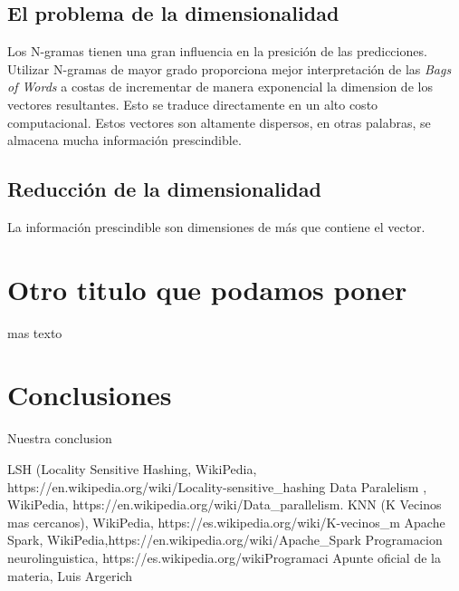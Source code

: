 \documentclass[a4paper,10pt]{article}
\begin{document}
	\subsection{El problema de la dimensionalidad}
	Los N-gramas tienen una gran influencia en la presición de las predicciones. Utilizar N-gramas de mayor grado proporciona mejor interpretación de las \textit{Bags of Words} a costas de incrementar de manera exponencial la dimension de los vectores resultantes. Esto se traduce directamente en un alto costo computacional. Estos vectores son altamente dispersos, en otras palabras, se almacena mucha información prescindible.
	
	\subsection{Reducción de la dimensionalidad}
	La información prescindible son dimensiones de más que contiene el vector. 
	
	\section{Otro titulo que podamos poner}
	
	mas texto
	
	\section{Conclusiones}
	
	Nuestra conclusion
	
	\begin{thebibliography}{99}
		 LSH (Locality Sensitive Hashing, WikiPedia, https://en.wikipedia.org/wiki/Locality-sensitive_hashing
		 Data Paralelism , WikiPedia, https://en.wikipedia.org/wiki/Data_parallelism.
		 KNN (K Vecinos mas cercanos), WikiPedia, https://es.wikipedia.org/wiki/K-vecinos_m%
		 Apache Spark, WikiPedia,https://en.wikipedia.org/wiki/Apache_Spark
		 Programacion neurolinguistica, https://es.wikipedia.org/wikiProgramaci%
		 Apunte oficial de la materia, Luis Argerich

	\end{thebibliography}
	
\end{document}

